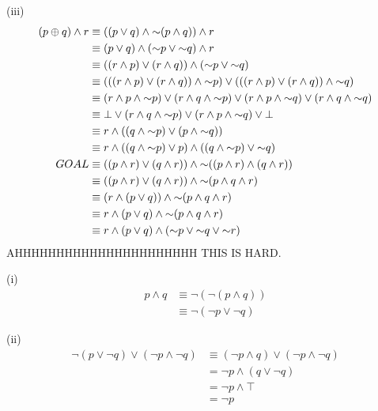 \documentclass{report}
\begin{document}
\sol (iii)
\begin{align*}
	(p\oplus q) \land r &\equiv ((p \lor q) \land \mathord{\sim} (p \land q)) \land r \\ 
		&\equiv (p \lor q) \land (\mathord{\sim} p \lor\mathord{\sim} q) \land r \\ 
		&\equiv ((r\land p) \lor (r\land q)) \land (\mathord{\sim} p \lor\mathord{\sim} q) \\ 
		&\equiv (((r\land p) \lor (r\land q)) \land \mathord{\sim} p) \lor (((r\land p) \lor (r\land q)) \land \mathord{\sim} q) \\ 
		&\equiv (r\land p\land \mathord{\sim} p) \lor (r\land q\land \mathord{\sim} p) \lor (r\land p\land \mathord{\sim} q) \lor (r\land q\land \mathord{\sim} q) \\
		&\equiv \bot \lor (r\land q\land \mathord{\sim} p) \lor (r\land p\land \mathord{\sim} q) \lor \bot \\
		&\equiv r\land ((q\land \mathord{\sim} p) \lor (p\land \mathord{\sim} q)) \\
		&\equiv r\land ((q\land \mathord{\sim} p) \lor p) \land ((q\land \mathord{\sim} p) \lor\mathord{\sim} q) \\
	GOAL &\equiv ((p\land r) \lor (q\land r)) \land \mathord{\sim}((p\land r)\land(q\land r)) \\
		&\equiv ((p\land r) \lor (q\land r)) \land \mathord{\sim}(p\land q \land r) \\
		&\equiv (r\land(p\lor q)) \land \mathord{\sim}(p\land q \land r) \\
		&\equiv r\land(p\lor q) \land \mathord{\sim}(p\land q \land r) \\
		&\equiv r\land(p\lor q) \land(\mathord{\sim} p\lor\mathord{\sim} q \lor\mathord{\sim} r) \\
\end{align*}
AHHHHHHHHHHHHHHHHHHHHHH THIS IS HARD.

\sol (i)
\begin{align*}
	p\land q &\equiv \lnot (\lnot (p\land q)) \\
		&\equiv \lnot (\lnot p \lor \lnot q)
\end{align*}

\sol (ii)
\begin{align*}
	\lnot (p\lor \lnot q) \lor (\lnot p\land \lnot q) &\equiv (\lnot p\land q) \lor (\lnot p\land \lnot q) \\
		&= \lnot p \land (q\lor \lnot q) \\
		&= \lnot p \land \top \\
		&= \lnot p
\end{align*}
\end{document}
